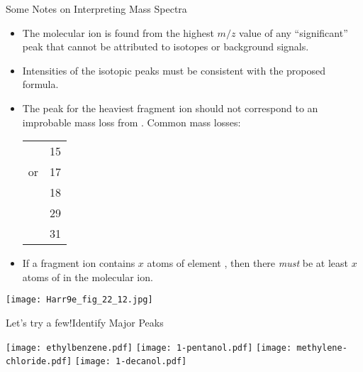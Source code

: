 \documentclass[handout]{beamer}
\begin{document}
\begin{frame}[allowframebreaks]{Some Notes on Interpreting Mass Spectra}
	\begin{itemize}
		\item The molecular ion is found from the highest $m/z$ value of
			any ``significant'' peak that cannot be attributed to
			isotopes or background signals.
		\item Intensities of the isotopic peaks must be consistent with
			the proposed formula.
		\item The peak for the heaviest \alert{fragment ion} should not
			correspond to an improbable mass loss from .
			Common mass losses:
		
			\begin{center}
			\begin{tabu} to \linewidth {c c}
				 & 15 \\
				 or  & 17 \\
				 & 18 \\
				 & 29 \\
				 & 31
			\end{tabu}
			\end{center}

		\item If a fragment ion contains $x$ atoms of element ,
			then there \emph{must} be at least $x$ atoms of 
			in the molecular ion.
	\end{itemize}

	\framebreak

	\begin{center}
		\texttt{[image: Harr9e\_fig\_22\_12.jpg]}
	\end{center}
\end{frame}

\begin{frame}[allowframebreaks]{Let's try a few!}{Identify Major Peaks}
	{\centering
		\texttt{[image: ethylbenzene.pdf]}
		\texttt{[image: 1-pentanol.pdf]}
		\texttt{[image: methylene-chloride.pdf]}
		\texttt{[image: 1-decanol.pdf]}
		\par}
\end{frame}

\end{document}
